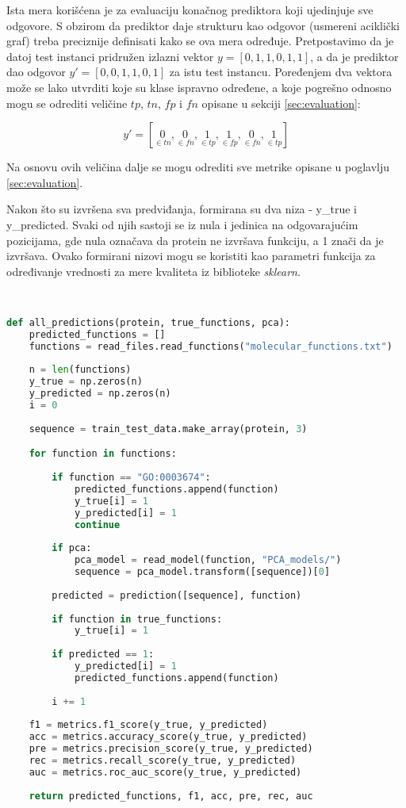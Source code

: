 Ista mera korišćena je za evaluaciju konačnog prediktora koji ujedinjuje sve odgovore. S obzirom da prediktor daje strukturu kao odgovor (usmereni aciklički graf) treba preciznije definisati kako se ova mera određuje. Pretpostavimo da je datoj test instanci pridružen izlazni vektor $y = [0, 1, 1, 0, 1, 1]$, a da je prediktor dao odgovor $y' = [0, 0, 1, 1, 0, 1]$ za istu test instancu. Poređenjem dva vektora može se lako utvrditi koje su klase ispravno određene, a koje pogrešno odnosno mogu se odrediti veličine $tp$, $tn$, $fp$ i $fn$ opisane u sekciji \ref{sec:evaluation}:

$$y' = [\underset{\in tn}{0}, \underset{\in fn}{0}, \underset{\in tp}{1}, \underset{\in fp}{1}, \underset{\in fn}{0}, \underset{\in tp}{1}]$$

\noindent Na osnovu ovih veličina dalje se mogu odrediti sve metrike opisane u poglavlju \ref{sec:evaluation}.

Nakon što su izvršena sva predviđanja, formirana su dva niza - y\_true i y\_predicted. Svaki od njih sastoji se iz nula i jedinica na odgovarajućim pozicijama, gde nula označava da protein ne izvršava funkciju, a 1 znači da je izvršava. Ovako formirani nizovi mogu se koristiti kao parametri funkcija za određivanje vrednosti za mere kvaliteta iz biblioteke \textit{sklearn}. 

~ 
\begin{lstlisting}[language=Python]
def all_predictions(protein, true_functions, pca):
	predicted_functions = []
	functions = read_files.read_functions("molecular_functions.txt")
	
	n = len(functions)
	y_true = np.zeros(n)
	y_predicted = np.zeros(n)
	i = 0
	
	sequence = train_test_data.make_array(protein, 3)

	for function in functions:
	
		if function == "GO:0003674":
			predicted_functions.append(function)
			y_true[i] = 1
			y_predicted[i] = 1
			continue	
			
		if pca:
			pca_model = read_model(function, "PCA_models/")
			sequence = pca_model.transform([sequence])[0]
			
		predicted = prediction([sequence], function)
		
		if function in true_functions:
			y_true[i] = 1
		
		if predicted == 1:
			y_predicted[i] = 1
			predicted_functions.append(function)
		
		i += 1
	
	f1 = metrics.f1_score(y_true, y_predicted)
	acc = metrics.accuracy_score(y_true, y_predicted)
	pre = metrics.precision_score(y_true, y_predicted)
	rec = metrics.recall_score(y_true, y_predicted)
	auc = metrics.roc_auc_score(y_true, y_predicted)
	
	return predicted_functions, f1, acc, pre, rec, auc
\end{lstlisting}



